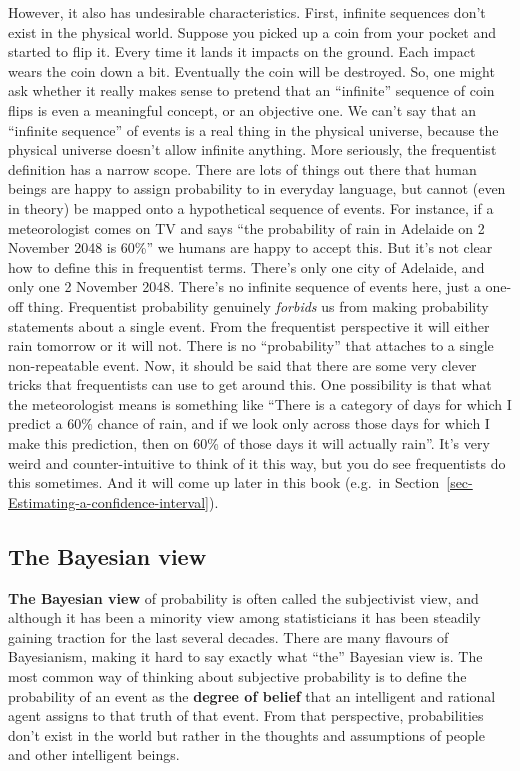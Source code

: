 \documentclass[
  a4paper,
]{book}
\begin{document}
However, it also has undesirable characteristics. First, infinite
sequences don't exist in the physical world. Suppose you picked up a
coin from your pocket and started to flip it. Every time it lands it
impacts on the ground. Each impact wears the coin down a bit. Eventually
the coin will be destroyed. So, one might ask whether it really makes
sense to pretend that an ``infinite'' sequence of coin flips is even a
meaningful concept, or an objective one. We can't say that an ``infinite
sequence'' of events is a real thing in the physical universe, because
the physical universe doesn't allow infinite anything. More seriously,
the frequentist definition has a narrow scope. There are lots of things
out there that human beings are happy to assign probability to in
everyday language, but cannot (even in theory) be mapped onto a
hypothetical sequence of events. For instance, if a meteorologist comes
on TV and says ``the probability of rain in Adelaide on 2 November 2048
is 60\%'' we humans are happy to accept this. But it's not clear how to
define this in frequentist terms. There's only one city of Adelaide, and
only one 2 November 2048. There's no infinite sequence of events here,
just a one-off thing. Frequentist probability genuinely \emph{forbids}
us from making probability statements about a single event. From the
frequentist perspective it will either rain tomorrow or it will not.
There is no ``probability'' that attaches to a single non-repeatable
event. Now, it should be said that there are some very clever tricks
that frequentists can use to get around this. One possibility is that
what the meteorologist means is something like ``There is a category of
days for which I predict a 60\% chance of rain, and if we look only
across those days for which I make this prediction, then on 60\% of
those days it will actually rain''. It's very weird and
counter-intuitive to think of it this way, but you do see frequentists
do this sometimes. And it will come up later in this book (e.g.~in
Section~\ref{sec-Estimating-a-confidence-interval}).

\hypertarget{the-bayesian-view}{%
\subsection{The Bayesian view}\label{the-bayesian-view}}

\textbf{The Bayesian view} of probability is often called the
subjectivist view, and although it has been a minority view among
statisticians it has been steadily gaining traction for the last several
decades. There are many flavours of Bayesianism, making it hard to say
exactly what ``the'' Bayesian view is. The most common way of thinking
about subjective probability is to define the probability of an event as
the \textbf{degree of belief} that an intelligent and rational agent
assigns to that truth of that event. From that perspective,
probabilities don't exist in the world but rather in the thoughts and
assumptions of people and other intelligent beings.
\end{document}
